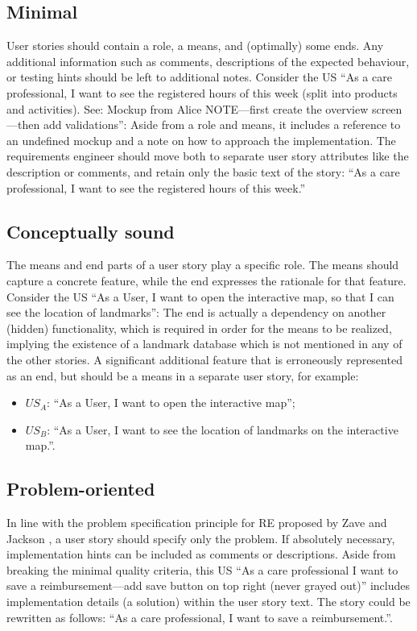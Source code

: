 \subsection*{\normalsize{Minimal}}
User stories should contain a role, a means, and (optimally) some ends. Any additional information such as comments, descriptions of the expected behaviour, or testing hints should be left to additional notes. Consider the US \enquote{As a care professional, I want to see the registered hours of this week (split into products and activities). See: Mockup from Alice NOTE—first create the overview screen—then add validations}: Aside from a role and means, it includes a reference to an undefined mockup and a note on how to approach the implementation. The requirements engineer should move both to separate user story attributes like the description or comments, and retain only the basic text of the story: \enquote{As a care professional, I want to see the registered hours of this week.}
\subsection*{\normalsize{Conceptually sound}}
The means and end parts of a user story play a specific role. The means should capture a concrete feature, while the end expresses the rationale for that feature. Consider the US \enquote{As a User, I want to open the interactive map, so that I can see the location of landmarks}: The end is actually a dependency on another (hidden) functionality, which is required in order for the means to be realized, implying the existence of a landmark database which is not mentioned in any of the other stories. A significant additional feature that is erroneously represented as an end, but should be a means in a separate user story, for example:
\begin{itemize}
\item $US_A$: \enquote{As a User, I want to open the interactive map};
\item $US_B$: \enquote{As a User, I want to see the location of landmarks on the interactive map.}.
\end{itemize}
\subsection*{\normalsize{Problem-oriented}}
In line with the problem specification principle for RE proposed by Zave and Jackson \cite{zave1997four}, a user story should specify only the problem. If absolutely necessary, implementation hints can be included as comments or descriptions. Aside from breaking the minimal quality criteria, this US \enquote{As a care professional I want to save a reimbursement—add save button on top right (never grayed out)} includes implementation details (a solution) within the user story text. The story could be rewritten as follows: \enquote{As a care professional, I want to save a reimbursement.}.
